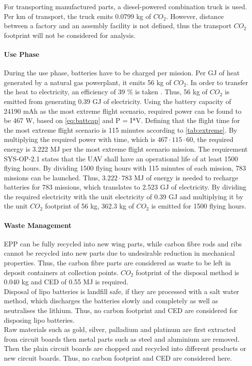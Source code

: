For transporting manufactured parts, a diesel-powered combination truck is used. Per km of transport, the truck emits 0.0799 kg of $CO_{2}$. However, distance between a factory and an assembly facility is not defined, thus the transport $CO_{2}$ footprint will not be considered for analysis.

\paragraph{Use Phase}
During the use phase, batteries have to be charged per mission. Per GJ of heat generated by a natural gas powerplant, it emits 56 kg of $CO_{2}$\cite{USLCI}. In order to transfer the heat to electricity, an efficiency of 39 \% is taken \cite{electricity}. Thus, 56 kg of $CO_{2}$ is emitted from generating 0.39 GJ of electricity. Using the battery capacity of 24190 mAh as the most extreme flight scenario, required power can be found to be 467 W, based on \autoref{eq:battcap} and P = I*V. Defining that the flight time for the most extreme flight scenario is 115 minutes according to \autoref{tab:extreme}. By multiplying the required power with time, which is $467\cdot115\cdot60$, the required energy is 3.222 MJ per the most extreme flight scenario mission. The requirement SYS-OP-2.1 states that the UAV shall have an operational life of at least 1500 flying hours. By dividing 1500 flying hours with 115 minutes of each mission, 783 missions can be launched. Thus, $3.222\cdot783$ MJ of energy is needed to recharge batteries for 783 missions, which translates to 2.523 GJ of electricity. By dividing the required electricity with the unit electricity of 0.39 GJ and multiplying it by the unit $CO_{2}$ footprint of 56 kg, 362.3 kg of $CO_{2}$ is emitted for 1500 flying hours. 

\paragraph{Waste Management}
EPP can be fully recycled into new wing parts, while carbon fibre rods and ribs cannot be recycled into new parts due to undesirable reduction in mechanical properties. Thus, the carbon fibre parts are considered as waste to be left in deposit containers at collection points. $CO_{2}$ footprint of the disposal method is 0.040 kg and CED of 0.55 MJ is required.\\
Disposal of lipo batteries is landfill safe, if they are processed with a salt water method, which discharges the batteries slowly and completely as well as neutralises the lithium. Thus, no carbon footprint and CED are considered for disposing lipo batteries.\\
Raw materials such as gold, silver, palladium and platinum are first extracted from circuit boards then metal parts such as steel and aluminium are removed. Then the plain circuit boards are chopped and recycled into different products or new circuit boards. Thus, no carbon footprint and CED are considered here.

